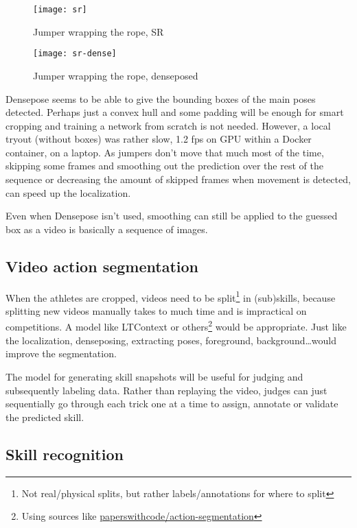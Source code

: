 \begin{figure}
    \centering
    \texttt{[image: sr]}
    \caption{Jumper wrapping the rope, SR}
    \label{proposal-fig:srwrap}
\end{figure}

\begin{figure}
    \centering
    \texttt{[image: sr-dense]}
    \caption{Jumper wrapping the rope, denseposed}
    \label{proposal-fig:srwrapdense}
\end{figure}

Densepose seems to be able to give the bounding boxes of the main poses detected. Perhaps just a convex hull and some padding will be enough for smart cropping and training a network from scratch is not needed.
However, a local tryout (without boxes) was rather slow, 1.2 fps on GPU within a Docker container, on a laptop.
As jumpers don’t move that much most of the time, skipping some frames and smoothing out the prediction over the rest of the sequence or decreasing the amount of skipped frames when movement is detected, can speed up the localization.

Even when Densepose isn’t used, smoothing can still be applied to the guessed box as a video is basically a sequence of images.

\subsection{Video action segmentation}

When the athletes are cropped, videos need to be split\footnote{Not real/physical splits, but rather labels/annotations for where to split} in (sub)skills, because splitting new videos manually takes to much time and is impractical on competitions. A model like LTContext \textcite{Jiaming_2023} or others\footnote{Using sources like \href{https://paperswithcode.com/task/action-segmentation}{paperswithcode/action-segmentation}} would be appropriate.
Just like the localization, denseposing, extracting poses, foreground, background\dots would improve the segmentation.

The model for generating skill snapshots will
be useful for judging and subsequently labeling
data. Rather than replaying the video, judges can
just sequentially go through each trick one at a
time to assign, annotate or validate the predicted
skill.

\subsection{Skill recognition}
\label{proposal-subsec:skill-recognition}

